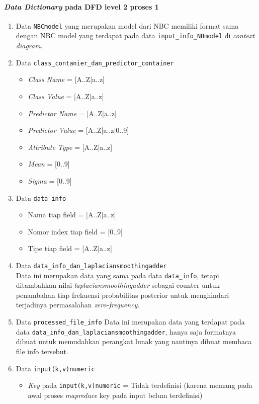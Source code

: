 \paragraph{\textit{Data Dictionary} pada DFD level 2 proses 1}
\begin{enumerate}
	\item{Data \verb|NBCmodel|}
	yang merupakan model dari NBC memiliki format sama dengan NBC model yang terdapat pada data \verb|input_info_NBmodel| di \textit{context diagram}.
	
	\item{Data \verb|class_contanier_dan_predictor_container|}
	\begin{itemize}
		\item \textit{Class Name} = [A..Z|a..z]
		\item \textit{Class Value} = [A..Z|a..z]
		\item \textit{Predictor Name} = [A..Z|a..z]
		\item \textit{Predictor Value} = [A..Z|a..z|0..9]
		\item \textit{Attribute Type} = [A..Z|a..z]
		\item \textit{Mean} = [0..9]
		\item \textit{Sigma} = [0..9]
	\end{itemize}

	\item{Data \verb|data_info|}
	\begin{itemize}
		\item Nama tiap field = [A..Z|a..z]
		\item Nomor index tiap field = [0..9]
		\item Tipe tiap field = [A..Z|a..z]
	\end{itemize}

	\item{Data \verb|data_info_dan_laplaciansmoothingadder|} \\
	Data ini merupakan data yang sama pada data \verb|data_info|, tetapi ditambahkan nilai \textit{laplaciansmoothingadder} sebagai counter untuk penambahan tiap frekuensi probabilitas posterior untuk menghindari terjadinya permasalahan \textit{zero-frequency}.
	
	\item{Data \verb|processed_file_info|}
	Data ini merupakan data yang terdapat pada data \verb|data_info_dan_laplaciansmoothingadder|, hanya saja formatnya dibuat untuk memudahkan perangkat lunak yang nantinya dibuat membaca file info tersebut.

	\item{Data \verb|input(k,v)numeric|}
	\begin{itemize}
		\item \textit{Key} pada \verb|input(k,v)numeric| = Tidak terdefinisi (karena memang pada awal proses \textit{mapreduce} key pada input belum terdefinisi)


\end{itemize}
\end{enumerate}
